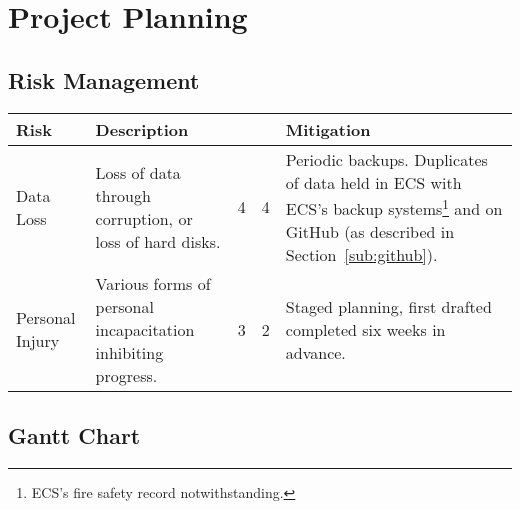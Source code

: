 \chapter{Project Planning}

\begin{landscape}
\section{Risk Management}
\begin{tabu} to 0.9\linewidth { X[3,r] | X[7,l] | X[c] | X[c] | X[7,l] }
\textbf{Risk} & \textbf{Description} &  &  & \textbf{Mitigation} \\ \hline
Data Loss &
  Loss of data through corruption, or loss of hard disks. &
  4 & 4 &
  Periodic backups. Duplicates of data held in ECS with ECS's backup
  systems\footnote{ECS's fire safety record notwithstanding\cite{fireRecord}.} and on GitHub (as described in Section~\ref{sub:github}). \\
Personal Injury &
  Various forms of personal incapacitation inhibiting progress. &
  3 & 2 &
  Staged planning, first drafted completed six weeks in advance. \\
\end{tabu}
\section{Gantt Chart}

\end{landscape}

